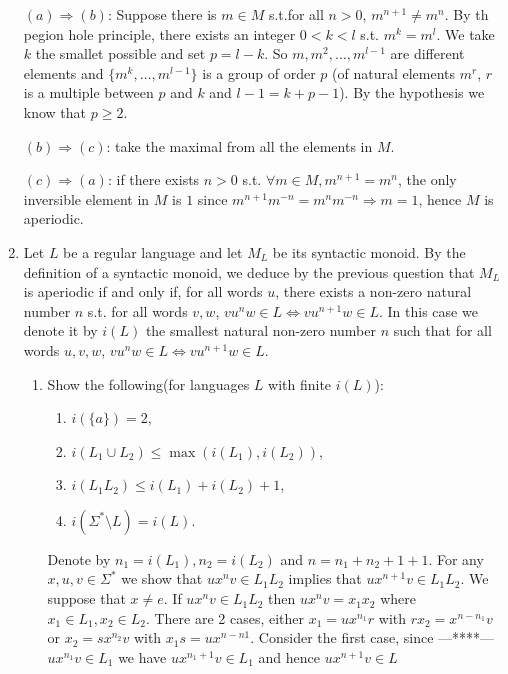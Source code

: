 \documentclass[a4paper,11pt]{exam}
\begin{document}
\begin{questions}
\begin{enumerate}[resume]
      \begin{solution}
        $(a) \Rightarrow (b)$: Suppose there is $m \in M$ s.t.for all $n>0$, $m^{n+1} \neq m^n$.
        By th pegion hole principle, there exists an integer $0<k<l$ s.t. $m^k = m^l$. We take $k$ the smallet possible and set $p=l-k$. So $m,m^2, \dots, m^{l-1}$ are different elements and $\{m^k, \dots, m^{l-1}\}$ is a group of order $p$ (of natural elements $m^r$, $r$ is a multiple between $p$ and $k$ and $l-1=k+p-1$).
        By the hypothesis we know that $p \geq 2$.

        $(b) \Rightarrow (c)$: take the maximal from all the elements in $M$.

        $(c) \Rightarrow (a)$: if there exists $n>0$ s.t.
        $\forall m \in M, m^{n+1} = m^n$, the only inversible element in $M$ is $1$ since $m^{n+1}m^{-n} = m^nm^{-n} \Rightarrow m = 1$,  hence $M$ is aperiodic.
      \end{solution}

    \item Let $L$ be a regular language and let $M_L$ be its syntactic monoid.
      By the definition of a syntactic monoid, we deduce by the previous question that $M_L$ is aperiodic if and only if, for all words $u$, there exists a non-zero natural number $n$ s.t. for all words $v,w$, $vu^nw \in L \Leftrightarrow vu^{n+1}w \in L$.
      In this case we denote it by $i(L)$ the smallest natural non-zero number $n$ such that for all words $u,v,w$, $vu^nw \in L \Leftrightarrow vu^{n+1}w \in L$. 
      \begin{enumerate}
        \item Show the following(for languages $L$ with finite $i(L)$):
          \begin{enumerate}
            \item $i(\{a\}) = 2$,
            \item $i(L_1\cup L_2) \leq \max(i(L_1), i(L_2))$,
            \item $i(L_1L_2) \leq i(L_1)+ i(L_2)+1$,
            \item $i(\Sigma^* \setminus L) = i(L)$.
          \end{enumerate}
      \begin{solution}
      	Denote by $n_1=i(L_1), n_2=i(L_2)$ and $n=n_1+n_2+1+1$.
      	For any $x,u,v\in \Sigma^* $ we show that $ux^nv\in L_1L_2$ implies that  $ux^{n+1}v\in L_1L_2$. 
      	We suppose that $x\neq e$. If $ux^nv\in L_1L_2$ then $ux^nv = x_1x_2$ where $x_1\in L_1, x_2\in L_2$. 
      	There are 2 cases, either $x_1 = ux^{n_1}r$ with $rx_2=x^{n-n_1}v$ or $x_2=sx^{n_2}v$ with $x_1s=ux^{n-n1}$. Consider the first case, since ---****--- $ux^{n_1}v\in L_1$ we have $ux^{n_1+1}v\in L_1$ and hence $ux^{n+1}v\in L$ 
      \end{solution}
      

\end{enumerate}
\end{enumerate}
\end{questions}
\end{document}
